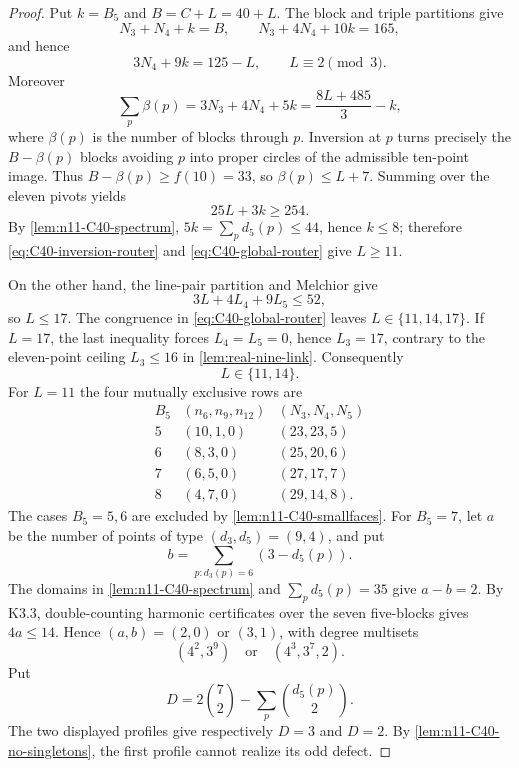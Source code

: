 \begin{proof}
Put $k=B_5$ and $B=C+L=40+L$.  The block and triple partitions give
\[
 N_3+N_4+k=B,\qquad N_3+4N_4+10k=165,
\]
and hence
\begin{equation}\label{eq:C40-global-router}
 3N_4+9k=125-L,\qquad L\equiv2\pmod3.
\end{equation}
Moreover
\[
 \sum_p\beta(p)=3N_3+4N_4+5k
               =\frac{8L+485}{3}-k,
\]
where $\beta(p)$ is the number of blocks through $p$.  Inversion at $p$
turns precisely the $B-\beta(p)$ blocks avoiding $p$ into proper circles
of the admissible ten-point image.  Thus
$B-\beta(p)\ge f(10)=33$, so $\beta(p)\le L+7$.  Summing over the eleven
pivots yields
\begin{equation}\label{eq:C40-inversion-router}
 25L+3k\ge254.
\end{equation}
By \cref{lem:n11-C40-spectrum}, $5k=\sum_pd_5(p)\le44$, hence $k\le8$;
therefore \eqref{eq:C40-inversion-router} and
\eqref{eq:C40-global-router} give $L\ge11$.

On the other hand, the line-pair partition and Melchior give
\[
 3L+4L_4+9L_5\le52,
\]
so $L\le17$.  The congruence in \eqref{eq:C40-global-router} leaves
$L\in\{11,14,17\}$.  If $L=17$, the last inequality forces
$L_4=L_5=0$, hence $L_3=17$, contrary to the eleven-point ceiling
$L_3\le16$ in \cref{lem:real-nine-link}.  Consequently
\[
 L\in\{11,14\}.
\]
For $L=11$ the four mutually exclusive rows are
\begin{equation}
\begin{array}{c|c|c}
B_5&(n_6,n_9,n_{12})&(N_3,N_4,N_5)\\ \hline
5&(10,1,0)&(23,23,5)\\
6&(8,3,0)&(25,20,6)\\
7&(6,5,0)&(27,17,7)\\
8&(4,7,0)&(29,14,8).
\end{array}\label{eq:C40-L11}
\end{equation}
The cases $B_5=5,6$ are excluded by
\cref{lem:n11-C40-smallfaces}.  For $B_5=7$, let $a$ be the number of
points of type $(d_3,d_5)=(9,4)$, and put
\[
 b=\sum_{p:d_3(p)=6}(3-d_5(p)).
\]
The domains in \cref{lem:n11-C40-spectrum} and $\sum_pd_5(p)=35$ give
$a-b=2$.  By K3.3, double-counting harmonic certificates over the seven
five-blocks gives $4a\le14$.  Hence $(a,b)=(2,0)$ or $(3,1)$, with degree
multisets
\[
(4^2,3^9)\quad\text{or}\quad(4^3,3^7,2).
\]
Put
\[
 D=2\binom72-\sum_p\binom{d_5(p)}2.
\]
The two displayed profiles give respectively $D=3$ and $D=2$.
By \cref{lem:n11-C40-no-singletons}, the first profile cannot realize its
odd defect.


\end{proof}
